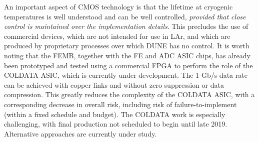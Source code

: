 An important aspect of CMOS technology is that the lifetime at cryogenic temperatures is well understood and can be
well controlled, {\em provided that close control is maintained over the implementation details}.
This precludes the use of commercial devices, which are not intended for use in LAr,
and which are produced by proprietary processes over which DUNE has no control.
It is worth noting that the FEMB, together with the FE and ADC ASIC chips, has already been prototyped and tested 
using a commercial FPGA to perform the role of the COLDATA ASIC,
which is currently under development.
The 1-Gb/s data rate can be achieved with copper links and without zero suppression or data compression.
This greatly reduces the complexity of the COLDATA ASIC, with a corresponding decrease in overall risk,
including risk of failure-to-implement (within a fixed schedule and budget).
The COLDATA work is especially challenging, with final production not scheduled to begin until late 2019.
Alternative approaches are currently under study.

